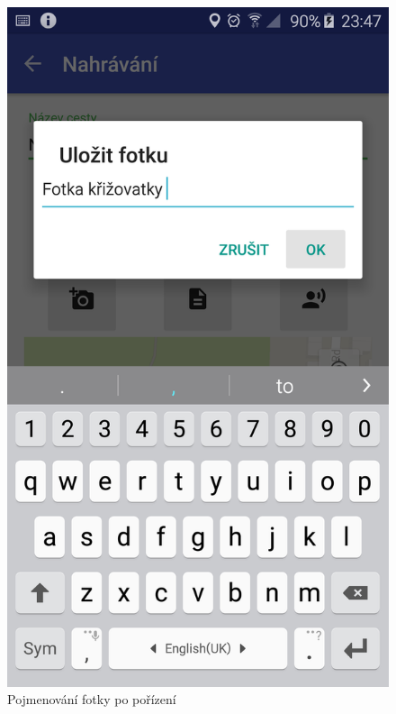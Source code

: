 \documentclass{article}
\begin{document}
\begin{figure}[H]
\begin{minipage}{.5\textwidth}
\centering
                \includegraphics[scale=0.14]{img/screen/ulozenifotky.png}
        \caption{Pojmenování fotky po pořízení}
        \label{fig:pridanifotky}
\end{minipage}
\begin{minipage}{.5\textwidth}
     \centering

\end{minipage}
\end{figure}
\end{document}
